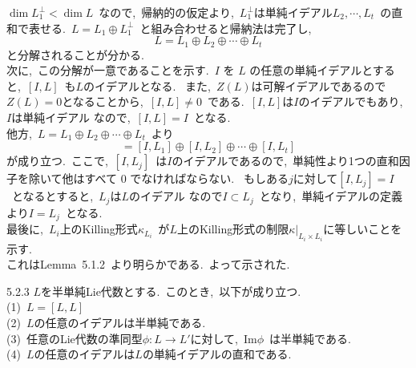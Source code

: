 \documentclass[uplatex,dvipdfmx]{jsarticle}
\begin{document}
\begin{myproof}
    $\dim L_1^\perp < \dim L$~なので,~帰納的の仮定より,~$L_1^\perp$は単純イデアル$L_2,\cdots,L_t$~の直和で表せる.~$L=L_1 \oplus L_1^\perp$~と組み合わせると帰納法は完了し,~
    \begin{equation*}
        L=L_1\oplus L_2 \oplus \cdots \oplus L_t
    \end{equation*}
    と分解されることが分かる.\\
    次に,~この分解が一意であることを示す.~$I$ を $L$ の任意の単純イデアルとすると,~$[I,L]$~も$L$のイデアルとなる.
    ~また,~$Z(L)$は可解イデアルであるので$Z(L)=0$となることから,~$[I,L]\neq 0$~である.~$[I,L]$は$I$のイデアルでもあり,~$I$は単純イデアル
    なので,~$[I,L]=I$~となる.\\
    他方,~$L=L_1\oplus L_2 \oplus \cdots \oplus L_t$~より
    \begin{equation*}
        [I,L]=[I,L_1]\oplus [I,L_2]\oplus \cdots \oplus [I,L_t]
    \end{equation*}
    が成り立つ.~ここで,~$[I,L_j]$~は$I$のイデアルであるので,~単純性より1つの直和因子を除いて他はすべて $0$ でなければならない.
    ~もしある$j$に対して$[I,L_j]=I$~となるとすると,~$L_j $は$L$のイデアル
    なので$I\subset L_j$~となり,~単純イデアルの定義より$I=L_j$~となる.\\
    最後に,~$L_i$上のKilling形式$\kappa_{L_i}$~が$L$上のKilling形式の制限$\kappa|_{L_i\times L_i}$に等しいことを示す.\\
    これはLemma~5.1.2~より明らかである.~よって示された.
\end{myproof}
\begin{mycor}{5.2.3}
    $L$を半単純Lie代数とする.~このとき,~以下が成り立つ.\\
    (1)~$L=[L,L]$\\
    (2)~$L$の任意のイデアルは半単純である.\\
    (3)~任意のLie代数の準同型$\phi :L\to L'$に対して,~$\text{Im} \phi$~は半単純である.\\
    (4)~$L$の任意のイデアルは$L$の単純イデアルの直和である.
\end{mycor}
\end{document}
